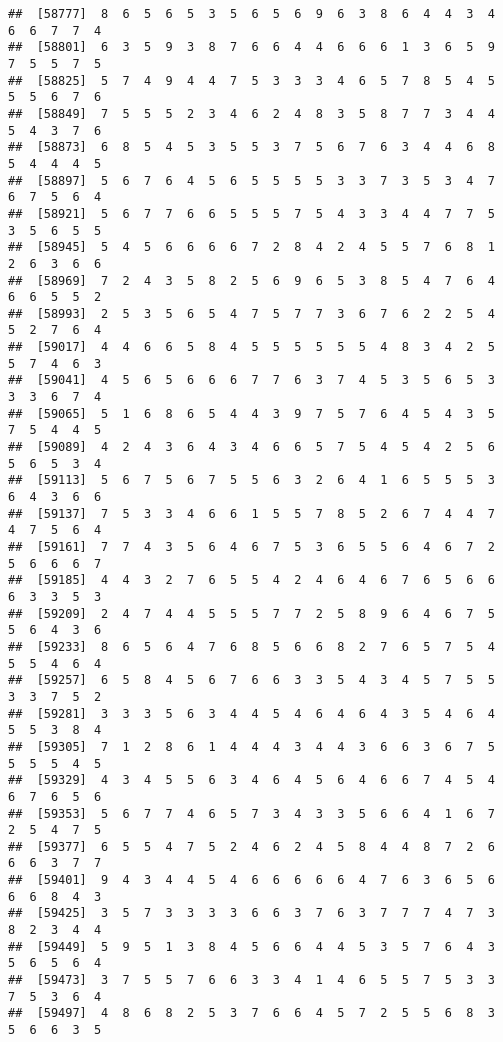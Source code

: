 \documentclass[
]{book}
\begin{document}
\begin{verbatim}
##  [58777]  8  6  5  6  5  3  5  6  5  6  9  6  3  8  6  4  4  3  4  6  6  7  7  4
##  [58801]  6  3  5  9  3  8  7  6  6  4  4  6  6  6  1  3  6  5  9  7  5  5  7  5
##  [58825]  5  7  4  9  4  4  7  5  3  3  3  4  6  5  7  8  5  4  5  5  5  6  7  6
##  [58849]  7  5  5  5  2  3  4  6  2  4  8  3  5  8  7  7  3  4  4  5  4  3  7  6
##  [58873]  6  8  5  4  5  3  5  5  3  7  5  6  7  6  3  4  4  6  8  5  4  4  4  5
##  [58897]  5  6  7  6  4  5  6  5  5  5  5  3  3  7  3  5  3  4  7  6  7  5  6  4
##  [58921]  5  6  7  7  6  6  5  5  5  7  5  4  3  3  4  4  7  7  5  3  5  6  5  5
##  [58945]  5  4  5  6  6  6  6  7  2  8  4  2  4  5  5  7  6  8  1  2  6  3  6  6
##  [58969]  7  2  4  3  5  8  2  5  6  9  6  5  3  8  5  4  7  6  4  6  6  5  5  2
##  [58993]  2  5  3  5  6  5  4  7  5  7  7  3  6  7  6  2  2  5  4  5  2  7  6  4
##  [59017]  4  4  6  6  5  8  4  5  5  5  5  5  5  4  8  3  4  2  5  5  7  4  6  3
##  [59041]  4  5  6  5  6  6  6  7  7  6  3  7  4  5  3  5  6  5  3  3  3  6  7  4
##  [59065]  5  1  6  8  6  5  4  4  3  9  7  5  7  6  4  5  4  3  5  7  5  4  4  5
##  [59089]  4  2  4  3  6  4  3  4  6  6  5  7  5  4  5  4  2  5  6  5  6  5  3  4
##  [59113]  5  6  7  5  6  7  5  5  6  3  2  6  4  1  6  5  5  5  3  6  4  3  6  6
##  [59137]  7  5  3  3  4  6  6  1  5  5  7  8  5  2  6  7  4  4  7  4  7  5  6  4
##  [59161]  7  7  4  3  5  6  4  6  7  5  3  6  5  5  6  4  6  7  2  5  6  6  6  7
##  [59185]  4  4  3  2  7  6  5  5  4  2  4  6  4  6  7  6  5  6  6  6  3  3  5  3
##  [59209]  2  4  7  4  4  5  5  5  7  7  2  5  8  9  6  4  6  7  5  5  6  4  3  6
##  [59233]  8  6  5  6  4  7  6  8  5  6  6  8  2  7  6  5  7  5  4  5  5  4  6  4
##  [59257]  6  5  8  4  5  6  7  6  6  3  3  5  4  3  4  5  7  5  5  3  3  7  5  2
##  [59281]  3  3  3  5  6  3  4  4  5  4  6  4  6  4  3  5  4  6  4  5  5  3  8  4
##  [59305]  7  1  2  8  6  1  4  4  4  3  4  4  3  6  6  3  6  7  5  5  5  5  4  5
##  [59329]  4  3  4  5  5  6  3  4  6  4  5  6  4  6  6  7  4  5  4  6  7  6  5  6
##  [59353]  5  6  7  7  4  6  5  7  3  4  3  3  5  6  6  4  1  6  7  2  5  4  7  5
##  [59377]  6  5  5  4  7  5  2  4  6  2  4  5  8  4  4  8  7  2  6  6  6  3  7  7
##  [59401]  9  4  3  4  4  5  4  6  6  6  6  6  4  7  6  3  6  5  6  6  6  8  4  3
##  [59425]  3  5  7  3  3  3  3  6  6  3  7  6  3  7  7  7  4  7  3  8  2  3  4  4
##  [59449]  5  9  5  1  3  8  4  5  6  6  4  4  5  3  5  7  6  4  3  5  6  5  6  4
##  [59473]  3  7  5  5  7  6  6  3  3  4  1  4  6  5  5  7  5  3  3  7  5  3  6  4
##  [59497]  4  8  6  8  2  5  3  7  6  6  4  5  7  2  5  5  6  8  3  5  6  6  3  5

\end{verbatim}
\end{document}
